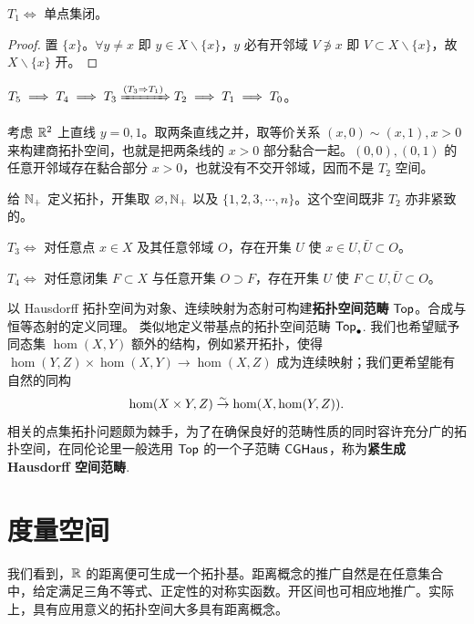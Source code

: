 \begin{theorem}
    $T_1\iff$ 单点集闭。
\end{theorem}
\begin{proof}
    置 $\{x\}$。$\forall y\ne x$ 即 $y\in X\backslash\{x\}$，$y$ 必有开邻域 $V\notni x$ 即 $V\subset X\backslash\{x\}$，故 $X\backslash\{x\}$ 开。
\end{proof}

\begin{theorem}
    $T_5\implies T_4\implies T_3\xRightarrow{(T_3\Rightarrow T_1)}T_2 \implies T_1\implies T_0$。
\end{theorem}

\begin{example}
    考虑 $\mathbb{R}^2$ 上直线 $y=0,1$。取两条直线之并，取等价关系 $(x,0) \sim(x,1),x>0$ 来构建商拓扑空间，也就是把两条线的 $x>0$ 部分黏合一起。$(0,0),(0,1)$ 的任意开邻域存在黏合部分 $x>0$，也就没有不交开邻域，因而不是 $T_2$ 空间。
\end{example}

\begin{example}
    给 $\mathbb{N}_+$ 定义拓扑，开集取 $\varnothing,\mathbb{N}_+$ 以及 $\{1,2,3,\cdots,n\}$。这个空间既非 $T_2$ 亦非紧致的。
\end{example}

\begin{theorem}[收缩(shrink)]
    $T_3\iff$ 对任意点 $x\in X$ 及其任意邻域 $O$，存在开集 $U$ 使
$x\in U, \bar U \subset O$。

$T_4\iff$ 对任意闭集 $F\subset X$ 与任意开集 $O\supset F$，存在开集 $U$ 使 $F\subset U, \bar U \subset O$。
\end{theorem}

以 Hausdorff 拓扑空间为对象、连续映射为态射可构建\textbf{拓扑空间范畴} $\mathsf{Top}$。合成与恒等态射的定义同理。
类似地定义带基点的拓扑空间范畴 $\mathsf{Top}_\bullet$. 我们也希望赋予同态集 $\hom(X,Y)$ 额外的结构，例如紧开拓扑，使得 $\hom(Y, Z) \times \hom(X, Y) \to \hom(X, Z)$ 成为连续映射；我们更希望能有自然的同构
\[ \hom(X \times Y, Z) \stackrel{\sim}{\rightarrow} \hom(X, \hom(Y, Z)). \]
相关的点集拓扑问题颇为棘手，为了在确保良好的范畴性质的同时容许充分广的拓扑空间，在同伦论里一般选用 $\mathsf{Top}$ 的一个子范畴 $\mathsf{CGHaus}$，称为\textbf{紧生成 Hausdorff 空间范畴}.

\section{度量空间}

我们看到，$\mathbb{R}$ 的距离便可生成一个拓扑基。距离概念的推广自然是在任意集合中，给定满足三角不等式、正定性的对称实函数。开区间也可相应地推广。实际上，具有应用意义的拓扑空间大多具有距离概念。

